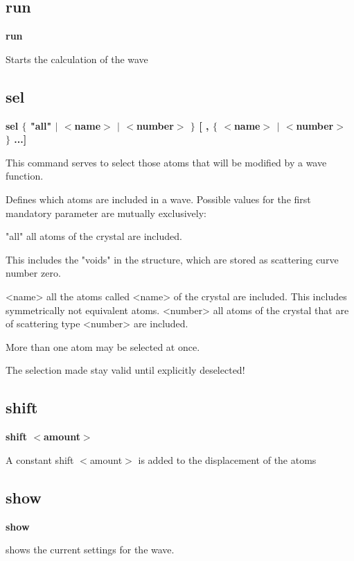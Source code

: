 \subsection*{run}
{\bf run \par }
\par
\vspace{3pt}
Starts the calculation of the wave 
\subsection*{sel}
{\bf sel $ \{$ "all" $| $ $ <$name$> $ $| $ $ <$number$> $ $\} $ [ , $ \{$ $ <$name$> $ $| $ $ <$number$> $ $\} $ ...] \par }
\par
\vspace{3pt}
This command serves to select 
those atoms that will be modified by a wave function. 
\par
Defines which atoms are included in a wave. Possible values 
for the first mandatory parameter are mutually exclusively: 
\par
\begin{MacVerbatim}
"all"     all atoms of the crystal are included.
\end{MacVerbatim}
          This includes the "voids" in the structure, which are stored 
          as scattering curve number zero. 
\begin{MacVerbatim}
<name>    all the atoms called <name> of the crystal are included.
          This includes symmetrically not equivalent atoms.
<number>  all atoms of the crystal that are of scattering type <number>
          are included.
\end{MacVerbatim}
More than one atom may be selected at once. 
\par
The selection made stay valid until explicitly deselected! 
\subsection*{shift}
{\bf shift $ <$amount$> $ \par }
\par
\vspace{3pt}
A constant shift $ <$amount$> $ is added to the displacement of the atoms 
\subsection*{show}
{\bf show \par }
\par
\vspace{3pt}
shows the current settings for the wave. 
